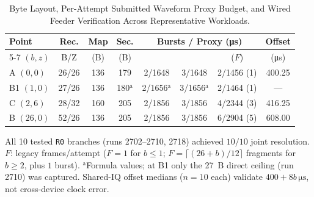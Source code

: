 \begin{table}[t]
\centering
\caption{Byte Layout, Per-Attempt Submitted Waveform Proxy Budget, and Wired Feeder Verification Across Representative Workloads.}
\label{tab:budget}
\setlength{\tabcolsep}{2.2pt}
\scriptsize
\begin{tabular}{@{}lccccccc@{}}
\toprule
\textbf{Point} & \textbf{Rec.} & \textbf{Map} & \textbf{\modejc{} Sec.} & \multicolumn{3}{c}{\textbf{Bursts / Proxy (\si{\micro\second})}} & \textbf{Offset} \\
\cmidrule(lr){5-7}
$(b,z)$ & B/Z & (B) & (B) & \modejc{} & \modesc{} & \modelc{} ($F$) & (\si{\micro\second}) \\
\midrule
A $(0,0)$   & 26/26 & 136 & 179 & 2/\num{1648} & 3/\num{1648} & 2/\num{1456} (1) & 400.25 \\
B1 $(1,0)$  & 27/26 & 136 & 180$^{\mathrm{a}}$ & 2/\num{1656}$^{\mathrm{a}}$ & 3/\num{1656}$^{\mathrm{a}}$ & 2/\num{1464} (1) & --- \\
C $(2,6)$   & 28/32 & 160 & 205 & 2/\num{1856} & 3/\num{1856} & 4/\num{2344} (3) & 416.25 \\
B $(26,0)$  & 52/26 & 136 & 205 & 2/\num{1856} & 3/\num{1856} & 6/\num{2904} (5) & 608.00 \\
\bottomrule
\end{tabular}
\par\smallskip
\raggedright\scriptsize
All 10 tested \texttt{R0} branches (runs 2702--2710, 2718) achieved $10/10$ joint resolution. $F$: legacy \ble{} frames/attempt ($F{=}1$ for $b\le 1$; $F{=}\lceil(26{+}b)/12\rceil$ \fragproto{} fragments for $b\ge 2$, plus $1$ \stdfour{} burst). $^{\mathrm{a}}$Formula values; at B1 only the \SI{27}{B} direct \modelc{} ceiling (run 2710) was captured. Shared-IQ offset medians ($n{=}10$ each) validate $400{+}8b\,\si{\micro\second}$, not cross-device clock error.
\end{table}
